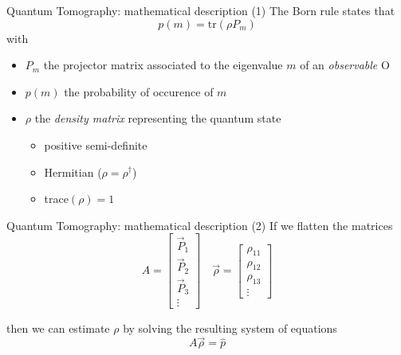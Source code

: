\documentclass{beamer}
\newcommand{\tr}{\text{tr}}
\begin{document}
\begin{frame}{Quantum Tomography: mathematical description (1)}
    The Born rule states that
    \begin{equation}
        p(m) = \tr(\rho P_m)
    \end{equation}
    with
    \begin{itemize}
        \item $P_m$ the projector matrix associated to the eigenvalue $m$ of an \textit{observable} O
        \item $p(m)$ the probability of occurence  of $m$
        \item $\rho$ the \textit{density matrix} representing the quantum state
        \begin{itemize}
            \item positive semi-definite
            \item Hermitian ($\rho = \rho^\dagger$)
            \item trace$(\rho)=1$
        \end{itemize}
    \end{itemize}
\end{frame}
\begin{frame}{Quantum Tomography: mathematical description (2)}
    If we flatten the matrices
    \begin{equation}
        A = \begin{bmatrix}
            \vec P_1\\
            \vec P_2\\
            \vec P_3\\
            \vdots
        \end{bmatrix}
        \quad\vec{\rho} = \begin{bmatrix}
            \rho_{11} \\
            \rho_{12} \\
            \rho_{13} \\
            \vdots
        \end{bmatrix}
    \end{equation}

    then we can estimate $\rho$ by solving the resulting system of equations 
    \begin{equation}
        A\vec{\rho} = \hat p
    \end{equation}
\end{frame}
\end{document}
